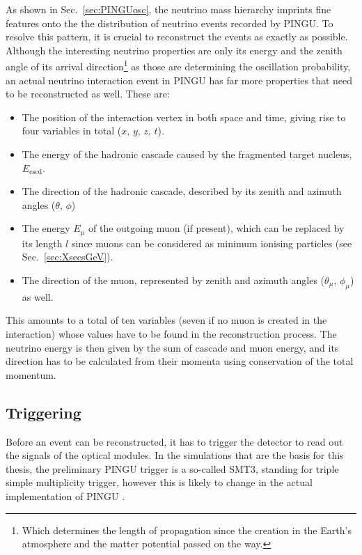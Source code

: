 As shown in Sec.~\ref{sec:PINGUosc}, the neutrino mass hierarchy
imprints fine features onto the the distribution of neutrino events recorded by
PINGU. To resolve this pattern,
it is crucial to
reconstruct the events as exactly as possible. Although the interesting neutrino
properties are only its energy and the zenith angle of its arrival
direction\footnote{Which determines the length of propagation since the
creation in the Earth's atmosphere and the matter potential passed on the way.}
as those are determining the oscillation probability, an actual neutrino
interaction event in PINGU has far more properties that need to be
reconstructed as well. These are:
\begin{itemize}
 \item The position of the interaction vertex in both space and time, giving
  rise to four variables in total ($x,\,y,\,z,\,t$).
 \item The energy of the hadronic cascade caused by the fragmented target
  nucleus, $E_\mathrm{cscd}$.
 \item The direction of the hadronic cascade, described by its zenith and
  azimuth angles ($\theta,\,\phi$)
 \item The energy $E_\mu$ of the outgoing muon (if present), which can be
  replaced by its length $l$ since muons can be
  considered as minimum ionising particles (see Sec.~\ref{sec:XsecsGeV}).
 \item The direction of the muon, represented by zenith and azimuth angles
  ($\theta_\mu,\,\phi_\mu$) as well.
\end{itemize}
This amounts to a total of ten variables (seven if no muon is created in the
interaction) whose values have to be found in the reconstruction process. The
neutrino energy is then given by the sum of cascade and muon energy, and its
direction has to be calculated from their momenta using conservation of the
total momentum. 

\subsection{Triggering}
\label{sec:reco_trigger}

Before an event can be reconstructed, it has to trigger the detector to read out
the signals of the optical modules. In the simulations that are the basis for
this thesis, the preliminary PINGU trigger is a so-called SMT3, standing for
triple simple multiplicity trigger, however this is likely to change in the
actual implementation of PINGU \cite{Trigger}.

